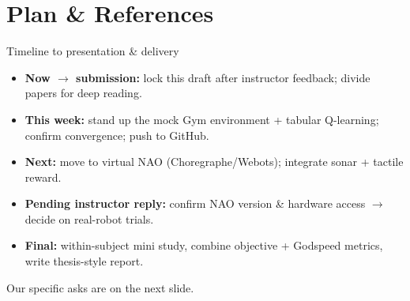 \documentclass[aspectratio=169,10pt]{beamer}
\begin{document}
\section{Plan \& References}

\begin{frame}{Timeline to presentation \& delivery}
  \footnotesize
  \begin{itemize}
    \item \textbf{Now $\to$ submission:} lock this draft after instructor feedback; divide papers for deep reading.
    \item \textbf{This week:} stand up the mock Gym environment + tabular Q-learning; confirm convergence; push to GitHub.
    \item \textbf{Next:} move to virtual NAO (Choregraphe/Webots); integrate sonar + tactile reward.
    \item \textbf{Pending instructor reply:} confirm NAO version \& hardware access $\to$ decide on real-robot trials.
    \item \textbf{Final:} within-subject mini study, combine objective + Godspeed metrics, write thesis-style report.
  \end{itemize}
  \begin{block}{}
    \footnotesize Our specific asks are on the next slide.
  \end{block}
\end{frame}
\end{document}
